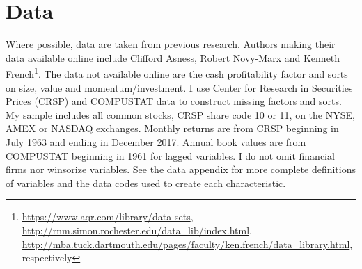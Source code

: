 
\section{Data}

Where possible, data are taken from previous research. Authors making their data available
online include Clifford Asness, Robert Novy-Marx  and Kenneth French\footnote{
\url{https://www.aqr.com/library/data-sets},
\url{http://rnm.simon.rochester.edu/data_lib/index.html},
\url{http://mba.tuck.dartmouth.edu/pages/faculty/ken.french/data_library.html},
respectively}.
The data not available online are the cash profitability factor and sorts on size, value
and momentum/investment. I use Center for Research in Securities Prices (CRSP) and
COMPUSTAT data to construct missing factors and sorts. My sample includes all common
stocks, CRSP share code 10 or 11, on the NYSE, AMEX or NASDAQ exchanges. Monthly returns
are from CRSP beginning in July 1963 and ending in December 2017. Annual book values are
from COMPUSTAT beginning in 1961 for lagged variables. I do not omit financial firms nor
winsorize variables. See the data appendix for more complete definitions of variables and
the data codes used to create each characteristic.

